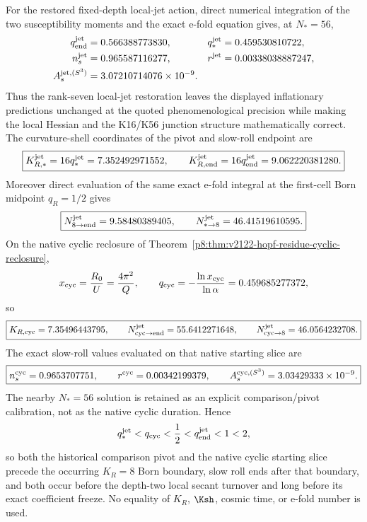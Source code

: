 \documentclass[12pt,a4paper]{article}
\begin{document}
\begin{theorem}
For the restored fixed-depth local-jet action, direct numerical integration of
the two susceptibility moments and the exact e-fold equation gives, at
$N_*=56$,
\begin{align}
 q_{\rm end}^{\rm jet}&=0.566388773830,&
 q_*^{\rm jet}&=0.459530810722,\\
 n_s^{\rm jet}&=0.965587116277,&
 r^{\rm jet}&=0.00338038887247,\\
 A_s^{{\rm jet},(S^3)}&=3.07210714076\times10^{-9}.&&
\end{align}
Thus the rank-seven local-jet restoration leaves the displayed inflationary
predictions unchanged at the quoted phenomenological precision while making
the local Hessian and the K16/K56 junction structure mathematically correct.
The curvature-shell coordinates of the pivot and slow-roll endpoint are
\begin{equation}
\label{p8:eq:v2121-inflation-curvature-shell-values}
 \boxed{
 K_{R,*}^{\rm jet}=16q_*^{\rm jet}=7.352492971552,\qquad
 K_{R,\rm end}^{\rm jet}=16q_{\rm end}^{\rm jet}=9.062220381280.}
\end{equation}
Moreover direct evaluation of the same exact e-fold integral at the first-cell
Born midpoint \(q_R=1/2\) gives
\begin{equation}
\label{p8:eq:v2121-k8-efolds}
 \boxed{
 N_{8\to\rm end}^{\rm jet}=9.58480389405,\qquad
 N_{*\to8}^{\rm jet}=46.41519610595.}
\end{equation}
On the native cyclic reclosure of
Theorem~\ref{p8:thm:v2122-hopf-residue-cyclic-reclosure},
\[
 x_{\rm cyc}=\frac{R_0}{U}=\frac{4\pi^2}{Q},
 \qquad
 q_{\rm cyc}=-\frac{\ln x_{\rm cyc}}{\ln\alpha}
 =0.459685277372,
\]
so
\begin{equation}
\label{p8:eq:v2122-cyclic-inflation-replay}
 \boxed{
 K_{R,\rm cyc}=7.35496443795,
 \qquad
 N_{\rm cyc\to end}^{\rm jet}=55.6412271648,
 \qquad
 N_{\rm cyc\to8}^{\rm jet}=46.0564232708.}
\end{equation}
The exact slow-roll values evaluated on that native starting slice are
\begin{equation}
\label{p8:eq:v2122-cyclic-inflation-observables}
 \boxed{
 n_s^{\rm cyc}=0.9653707751,
 \qquad
 r^{\rm cyc}=0.00342199379,
 \qquad
 A_s^{{\rm cyc},(S^3)}=3.03429333\times10^{-9}.}
\end{equation}
The nearby \(N_*=56\) solution is retained as an explicit comparison/pivot
calibration, not as the native cyclic duration.
Hence
\[
 q_*^{\rm jet}<q_{\rm cyc}<\frac12<q_{\rm end}^{\rm jet}<1<2,
\]
so both the historical comparison pivot and the native cyclic starting slice precede the occurring \(K_R=8\) Born boundary,
slow roll ends after that boundary, and both occur before the depth-two local
secant turnover and long before its exact coefficient freeze.  No equality of
\(K_R\), \(\Ksh\), cosmic time, or e-fold number is used.
\end{theorem}
\end{document}
